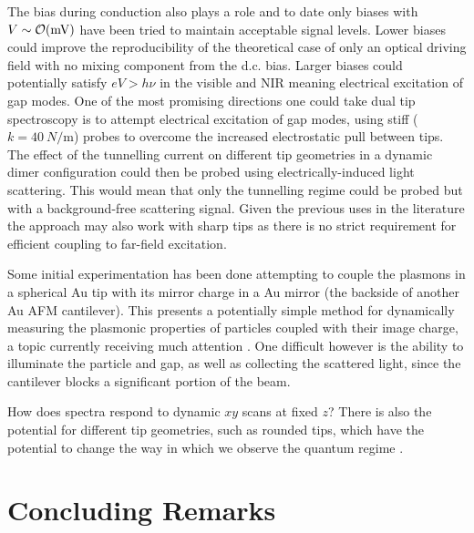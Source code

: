 \documentclass[12pt, a4paper, twoside]{book}
\begin{document}
The bias during conduction also plays a role \cite{} and to date only biases with $V\sim\mathcal{O}({\textrm{mV}})$ have been tried to maintain acceptable signal levels. Lower biases could improve the reproducibility of the theoretical case of only an optical driving field with no mixing component from the d.c. bias. Larger biases could potentially satisfy $eV>h\nu$ in the visible and NIR meaning electrical excitation of gap modes.
One of the most promising directions one could take dual tip spectroscopy is to attempt electrical excitation of gap modes, using stiff ($k=\SI{40}{N\per\metre}$) probes to overcome the increased electrostatic pull between tips. The effect of the tunnelling current on different tip geometries in a dynamic dimer configuration could then be probed using electrically-induced light scattering. This would mean that only the tunnelling regime could be probed but with a background-free scattering signal. Given the previous uses in the literature the approach may also work with sharp tips as there is no strict requirement for efficient coupling to far-field excitation.

Some initial experimentation has been done attempting to couple the plasmons in a spherical Au tip with its mirror charge in a Au mirror (the backside of another Au AFM cantilever). This presents a potentially simple method for dynamically measuring the plasmonic properties of particles coupled with their image charge, a topic currently receiving much attention \cite{mertens2013, benz2014}. One difficult however is the ability to illuminate the particle and gap, as well as collecting the scattered light, since the cantilever blocks a significant portion of the beam.

How does spectra respond to dynamic $xy$ scans at fixed $z$?
There is also the potential for different tip geometries, such as rounded tips, which have the potential to change the way in which we observe the quantum regime \cite{}.

\section{Concluding Remarks}

\ifstandalone
\begin{singlespace}
\fontsize{8pt}{1em}\selectfont
\printbibliography[notcategory=fullcited]
\end{singlespace}
\fi
\end{document}
